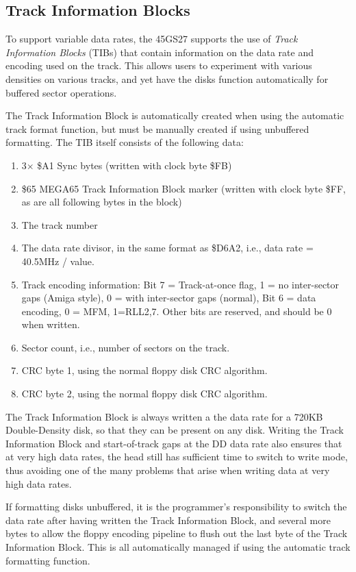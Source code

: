 \subsection{Track Information Blocks}

To support variable data rates, the 45GS27 supports the use of
{\em Track Information Blocks} (TIBs) that contain information on the
data rate and encoding used on the track. This allows users to experiment with various densities on various tracks,
and yet have the disks function automatically for buffered sector operations.

The Track Information Block is automatically created when using the automatic track format function, but must be
manually created if using unbuffered formatting. The TIB itself consists of the following data:

\begin{enumerate}
\item 3$\times$ \$A1 Sync bytes (written with clock byte \$FB)
\item \$65 MEGA65 Track Information Block marker (written with clock byte \$FF, as are all following bytes in the block)
\item The track number
\item The data rate divisor, in the same format as \$D6A2, i.e., data rate = 40.5MHz / value.
\item Track encoding information: Bit 7 = Track-at-once flag, 1 = no inter-sector gaps (Amiga style), 0 = with inter-sector gaps (normal), Bit 6 = data encoding, 0 = MFM, 1=RLL2,7. Other bits are reserved, and should be 0 when written.
\item Sector count, i.e., number of sectors on the track.
\item CRC byte 1, using the normal floppy disk CRC algorithm.
\item CRC byte 2, using the normal floppy disk CRC algorithm.
\end{enumerate}

The Track Information Block is always written a the data rate for a 720KB Double-Density disk,
so that they can be present on any disk.  Writing the Track Information Block and start-of-track
gaps at the DD data rate also ensures that at very high data rates, the head still has sufficient
time to switch to write mode, thus avoiding one of the many problems that arise when writing data
at very high data rates.

If formatting disks unbuffered, it is the programmer's responsibility to switch the data rate after
having written the Track Information Block, and several more bytes to allow the floppy encoding
pipeline to flush out the last byte of the Track Information Block.
This is all automatically managed if using the automatic track formatting function.

